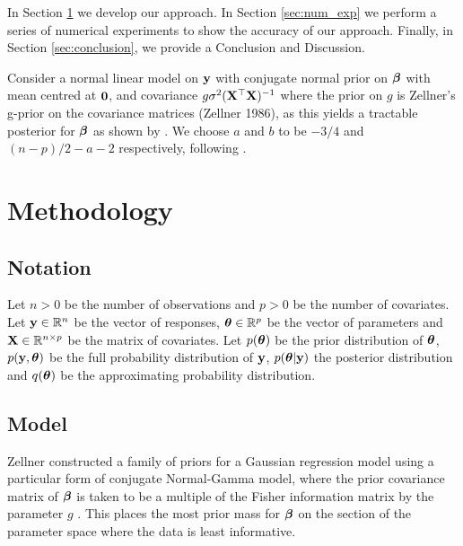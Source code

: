 \documentclass{amsart}[12pt]
\begin{document}

In Section \ref{sec:methodology} we develop our approach. In Section
\ref{sec:num_exp} we perform a series of numerical experiments to show the accuracy of our approach. Finally,
in Section \ref{sec:conclusion}, we provide a Conclusion and Discussion.

Consider a normal linear model on ${\bf y}$ with conjugate normal prior on ${\boldsymbol \beta}$ with mean centred at ${\bf 0}$,
and covariance $g \sigma^2 ({\bf X}^\top {\bf X})^{-1}$ where the prior on $g$ is Zellner's g-prior on the covariance
matrices (Zellner 1986), as this yields a tractable posterior for ${\boldsymbol \beta}$ as shown by \citep{Liang2008}. We
choose $a$  and $b$ to be $-3/4$ and $(n - p)/2 - a - 2$ respectively, following \citep{Maruyama2011}.

\section{Methodology}
\label{sec:methodology}

\subsection{Notation}


Let $n > 0$ be the number of observations and $p > 0$ be the number of covariates. Let ${\bf y} \in {\mathbb{R}}^n$ be the
vector of responses, ${\boldsymbol \theta} \in {\mathbb{R}}^p$ be the vector of parameters and ${\bf X} \in {\mathbb{R}}^{n \times p}$ be the
matrix of covariates. Let $p({\boldsymbol \theta})$ be the prior distribution of ${\boldsymbol \theta}$, $p({\bf y}, {\boldsymbol \theta})$ be the full
probability distribution of ${\bf y}$, $p({\boldsymbol \theta} | {\bf y})$ the posterior distribution and $q({\boldsymbol \theta})$ be the
approximating probability distribution. 

\subsection{Model}
\label{sec:model}

Zellner constructed a family of priors for a Gaussian regression model using a particular form of conjugate
Normal-Gamma model, where the prior covariance matrix of ${\boldsymbol \beta}$ is taken to be a multiple of the Fisher
information  matrix by the parameter $g$ \citep{Goel1986}. This places the most prior mass for ${\boldsymbol \beta}$ on the
section of the parameter space where the data is least informative.
\end{document}

